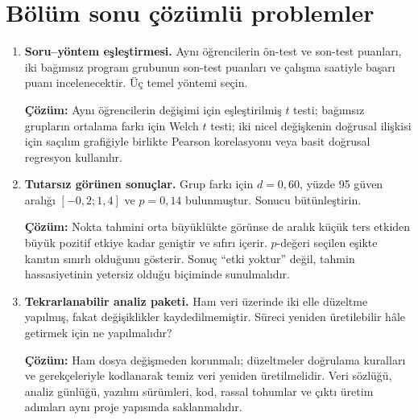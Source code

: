 \section{Bölüm sonu çözümlü problemler}

\begin{enumerate}
  \item \textbf{Soru--yöntem eşleştirmesi.} Aynı öğrencilerin ön-test ve son-test puanları, iki bağımsız program grubunun son-test puanları ve çalışma saatiyle başarı puanı incelenecektir. Üç temel yöntemi seçin.

  \textbf{Çözüm:} Aynı öğrencilerin değişimi için eşleştirilmiş $t$ testi; bağımsız grupların ortalama farkı için Welch $t$ testi; iki nicel değişkenin doğrusal ilişkisi için saçılım grafiğiyle birlikte Pearson korelasyonu veya basit doğrusal regresyon kullanılır.

  \item \textbf{Tutarsız görünen sonuçlar.} Grup farkı için $d=0{,}60$, yüzde 95 güven aralığı $[-0{,}2;1{,}4]$ ve $p=0{,}14$ bulunmuştur. Sonucu bütünleştirin.

  \textbf{Çözüm:} Nokta tahmini orta büyüklükte görünse de aralık küçük ters etkiden büyük pozitif etkiye kadar geniştir ve sıfırı içerir. $p$-değeri seçilen eşikte kanıtın sınırlı olduğunu gösterir. Sonuç ``etki yoktur'' değil, tahmin hassasiyetinin yetersiz olduğu biçiminde sunulmalıdır.

  \item \textbf{Tekrarlanabilir analiz paketi.} Ham veri üzerinde iki elle düzeltme yapılmış, fakat değişiklikler kaydedilmemiştir. Süreci yeniden üretilebilir hâle getirmek için ne yapılmalıdır?

  \textbf{Çözüm:} Ham dosya değişmeden korunmalı; düzeltmeler doğrulama kuralları ve gerekçeleriyle kodlanarak temiz veri yeniden üretilmelidir. Veri sözlüğü, analiz günlüğü, yazılım sürümleri, kod, rassal tohumlar ve çıktı üretim adımları aynı proje yapısında saklanmalıdır.
\end{enumerate}